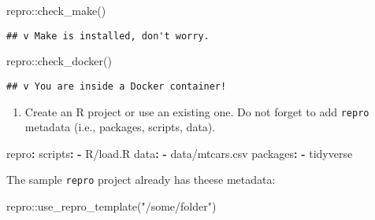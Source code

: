 \documentclass[psych,tutorial,submit,moreauthors,pdftex]{mdpi}
\providecommand{\tightlist}{%
  \setlength{\itemsep}{0pt}\setlength{\parskip}{4pt}}
\newenvironment{Shaded}{\begin{snugshade}}{\end{snugshade}}
\newcommand{\AttributeTok}[1]{\textcolor[rgb]{0.77,0.63,0.00}{#1}}
\newcommand{\FunctionTok}[1]{\textcolor[rgb]{0.00,0.00,0.00}{#1}}
\newcommand{\KeywordTok}[1]{\textcolor[rgb]{0.13,0.29,0.53}{\textbf{#1}}}
\newcommand{\NormalTok}[1]{#1}
\newcommand{\SpecialCharTok}[1]{\textcolor[rgb]{0.00,0.00,0.00}{#1}}
\newcommand{\StringTok}[1]{\textcolor[rgb]{0.31,0.60,0.02}{#1}}
\begin{document}
\begin{Shaded}
\begin{Highlighting}[]
\NormalTok{repro}\SpecialCharTok{::}\FunctionTok{check\_make}\NormalTok{()}
\end{Highlighting}
\end{Shaded}

\begin{verbatim}
## v Make is installed, don't worry.
\end{verbatim}

\begin{Shaded}
\begin{Highlighting}[]
\NormalTok{repro}\SpecialCharTok{::}\FunctionTok{check\_docker}\NormalTok{()}
\end{Highlighting}
\end{Shaded}

\begin{verbatim}
## v You are inside a Docker container!
\end{verbatim}

\begin{enumerate}
\def\labelenumi{\arabic{enumi}.}
\setcounter{enumi}{2}
\tightlist
\item
  Create an R project or use an existing one. Do not forget to add
  \texttt{repro} metadata (i.e., packages, scripts, data).
\end{enumerate}

\begin{Shaded}
\begin{Highlighting}[]
\FunctionTok{repro}\KeywordTok{:}
\AttributeTok{  }\FunctionTok{scripts}\KeywordTok{:}
\AttributeTok{    }\KeywordTok{{-}}\AttributeTok{ R/load.R}
\AttributeTok{  }\FunctionTok{data}\KeywordTok{:}
\AttributeTok{    }\KeywordTok{{-}}\AttributeTok{ data/mtcars.csv}
\AttributeTok{  }\FunctionTok{packages}\KeywordTok{:}
\AttributeTok{    }\KeywordTok{{-}}\AttributeTok{ tidyverse}
\end{Highlighting}
\end{Shaded}

The sample \texttt{repro} project already has theese metadata:

\begin{Shaded}
\begin{Highlighting}[]
\NormalTok{repro}\SpecialCharTok{::}\FunctionTok{use\_repro\_template}\NormalTok{(}\StringTok{"/some/folder"}\NormalTok{)}
\end{Highlighting}
\end{Shaded}
\end{document}

